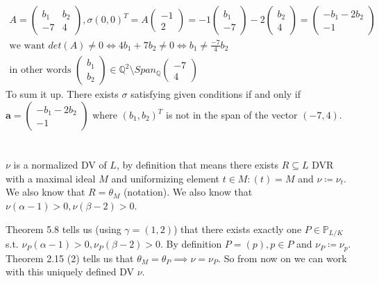 \documentclass[12pt, a4paper]{article}
\begin{document}
\begin{enumerate}[label=(\alph*)]
\begin{gather*}
A = \begin{pmatrix}b_1 & b_2 \\ -7 & 4\end{pmatrix}, \sigma(0,0)^T = A\begin{pmatrix}
-1 \\ 2
\end{pmatrix} = -1 \begin{pmatrix}
b_1 \\ -7
\end{pmatrix} -2 \begin{pmatrix}
b_2 \\ 4
\end{pmatrix} = \begin{pmatrix}
-b_1 - 2b_2\\ -1
\end{pmatrix}\\
\text{we want }det(A) \neq 0 \iff 4b_1 + 7b_2 \neq 0 \iff b_1 \neq \frac{-7}{4}b_2 \\
\text{in other words } \begin{pmatrix}
b_1 \\
b_2
\end{pmatrix} \in \mathbb{Q}^2 \setminus Span_{\mathbb{Q}}\begin{pmatrix}
-7 \\ 4
\end{pmatrix}
\end{gather*}
To sum it up. There exists $\sigma$ satisfying given conditions if and only if $\mathbf{a} = \begin{pmatrix}
-b_1-2b_2 \\ -1
\end{pmatrix}$ where $(b_1,b_2)^T$ is not in the span of the vector $(-7, 4)$.
\end{enumerate}


\section{}
$\nu$ is a normalized DV of $L$, by definition that means there exists $R \subseteq L$ DVR with a maximal ideal $M$ and uniformizing element $t \in M: (t)=M$ and $\nu \coloneqq \nu_t$. We also know that $R = \theta_M$ (notation). We also know that $\nu(\alpha-1)>0,\nu(\beta-2)>0$.

Theorem 5.8 tells us (using $\gamma = (1,2)$) that there exists exactly one $P \in \mathbb{P}_{L/K}$ s.t. $\nu_P(\alpha-1)>0,\nu_P(\beta-2)>0$. By definition $P = (p), p \in P$ and $\nu_P \coloneqq \nu_p$. Theorem 2.15 (2) tells us that $\theta_M = \theta_P \implies \nu = \nu_P$. So from now on we can work with this uniquely defined DV $\nu$.
\end{document}
